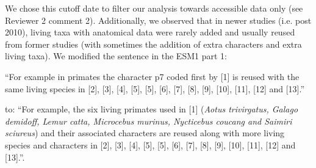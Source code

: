 \documentclass[12pt,letterpaper]{article}
\begin{document}
\begin{enumerate}
We chose this cutoff date to filter our analysis towards accessible data only (see Reviewer 2 comment 2).
Additionally, we observed that in newer studies (i.e. post 2010), living taxa with anatomical data were rarely added and usually reused from former studies (with sometimes the addition of extra characters and extra living taxa).
We modified the sentence in the ESM1 part 1:

``For example in primates the character p7 coded first by [1] is reused with the same living species in [2], [3], [4], [5], [5], [6], [7], [8], [9], [10], [11], [12] and [13].''

\noindent to: ``For example, the six living primates used in [1] (\textit{Aotus trivirgatus, Galago demidoff, Lemur catta, Microcebus murinus, Nycticebus coucang and Saimiri sciureus}) and their associated characters are reused along with more living species and characters in [2], [3], [4], [5], [5], [6], [7], [8], [9], [10], [11], [12] and [13].''.

\end{enumerate}
\end{document}
